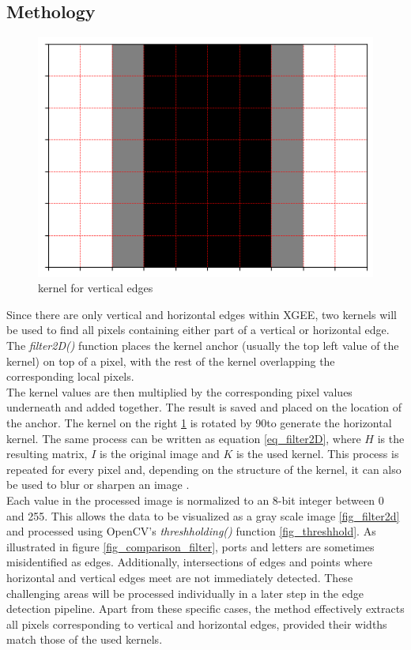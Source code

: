 \subsection{Methology}
\begin{figure}
    \centering
    \includegraphics[width=\linewidth]{Pictures/kernel_ver.png}
    \caption{kernel for vertical edges}
    \label{fig_kernel_ver}
\end{figure}
Since there are only vertical and horizontal edges within XGEE, two kernels will be used to find all pixels containing either part of a vertical or horizontal edge. The \textit{filter2D()} function places the kernel anchor (usually the top left value of the kernel) on top of a pixel, with the rest of the kernel overlapping the corresponding local pixels.\\
The kernel values are then multiplied by the corresponding pixel values underneath and added together. The result is saved and placed on the location of the anchor. The kernel on the right \ref{fig_kernel_ver} is rotated by 90\textdegree  to generate the horizontal kernel. The same process can be written as equation \ref{eq_filter2D}, where \(H\) is the resulting matrix, \(I\) is the original image and \(K\) is the used kernel. This process is repeated for every pixel and, depending on the structure of the kernel, it can also be used to blur or sharpen an image \cite{web_filter2D}.\\
Each value in the processed image is normalized to an 8-bit integer between 0 and 255. This allows the data to be visualized as a gray scale image \ref{fig_filter2d} and processed using OpenCV's \textit{threshholding()} function \ref{fig_threshhold}. As illustrated in figure \ref{fig_comparison_filter}, ports and letters are sometimes misidentified as edges. Additionally, intersections of edges and points where horizontal and vertical edges meet are not immediately detected. These challenging areas will be processed individually in a later step in the edge detection pipeline. Apart from these specific cases, the method effectively extracts all pixels corresponding to vertical and horizontal edges, provided their widths match those of the used kernels.
